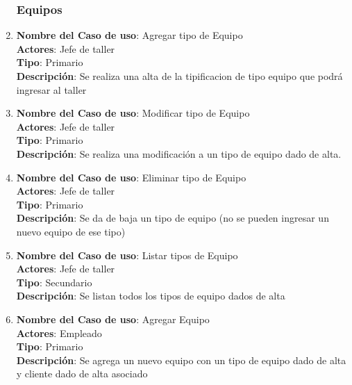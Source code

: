 \documentclass[12pt]{extarticle}
\begin{document}
\begin{spacing}{1.2}
\begin{enumerate}
        \subsubsection{Equipos}



        \item 	\textbf{Nombre del Caso de uso}: Agregar tipo de Equipo\\
                \textbf{Actores}: Jefe de taller\\
                \textbf{Tipo}: Primario\\
                \textbf{Descripción}: Se realiza una alta de la tipificacion de tipo equipo que podrá ingresar al taller 
        
        \item 	\textbf{Nombre del Caso de uso}: Modificar tipo de Equipo\\
                \textbf{Actores}: Jefe de taller\\
                \textbf{Tipo}: Primario\\
                \textbf{Descripción}: Se realiza una modificación a un tipo de equipo dado de alta.
        
        \item 	\textbf{Nombre del Caso de uso}: Eliminar tipo de Equipo\\
                \textbf{Actores}: Jefe de taller\\
                \textbf{Tipo}: Primario\\
                \textbf{Descripción}: Se da de baja un tipo de equipo (no se pueden ingresar un nuevo equipo de ese tipo)
        
        \item 	\textbf{Nombre del Caso de uso}: Listar tipos de Equipo\\
                \textbf{Actores}: Jefe de taller\\
                \textbf{Tipo}: Secundario\\
                \textbf{Descripción}: Se listan todos los tipos de equipo dados de alta
        
        \item 	\textbf{Nombre del Caso de uso}: Agregar Equipo\\
                \textbf{Actores}: Empleado\\
                \textbf{Tipo}: Primario\\
                \textbf{Descripción}: Se agrega un nuevo equipo con un tipo de equipo dado de alta y cliente dado de alta asociado
        

\end{enumerate}
\end{spacing}
\end{document}
